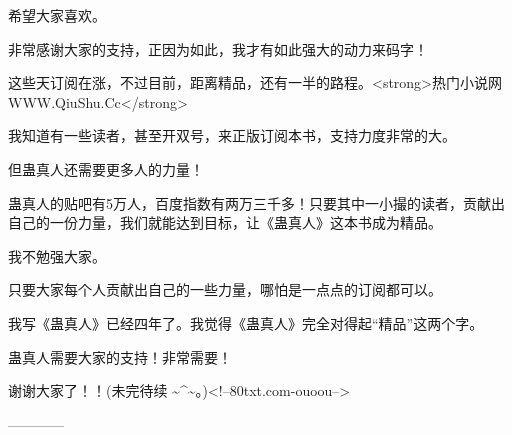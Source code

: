 \begin{this_body}
希望大家喜欢。

非常感谢大家的支持，正因为如此，我才有如此强大的动力来码字！

这些天订阅在涨，不过目前，距离精品，还有一半的路程。<strong>热门小说网WWW.QiuShu.Cc</strong>

我知道有一些读者，甚至开双号，来正版订阅本书，支持力度非常的大。

但蛊真人还需要更多人的力量！

蛊真人的贴吧有5万人，百度指数有两万三千多！只要其中一小撮的读者，贡献出自己的一份力量，我们就能达到目标，让《蛊真人》这本书成为精品。

我不勉强大家。

只要大家每个人贡献出自己的一些力量，哪怕是一点点的订阅都可以。

我写《蛊真人》已经四年了。我觉得《蛊真人》完全对得起“精品”这两个字。

蛊真人需要大家的支持！非常需要！

谢谢大家了！！(未完待续 \~{}\^{}\~{}。)<!--80txt.com-ouoou-->

------------

\end{this_body}

